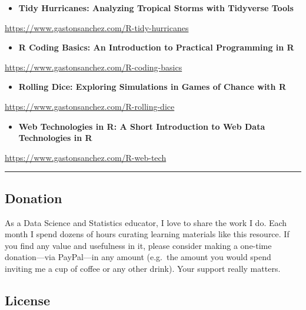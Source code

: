 \documentclass[
]{book}
\providecommand{\tightlist}{%
  \setlength{\itemsep}{0pt}\setlength{\parskip}{0pt}}
\begin{document}
\begin{itemize}
\tightlist
\item
  \textbf{Tidy Hurricanes: Analyzing Tropical Storms with Tidyverse Tools}
\end{itemize}

\url{https://www.gastonsanchez.com/R-tidy-hurricanes}

\begin{itemize}
\tightlist
\item
  \textbf{R Coding Basics: An Introduction to Practical Programming in R}
\end{itemize}

\url{https://www.gastonsanchez.com/R-coding-basics}

\begin{itemize}
\tightlist
\item
  \textbf{Rolling Dice: Exploring Simulations in Games of Chance with R}
\end{itemize}

\url{https://www.gastonsanchez.com/R-rolling-dice}

\begin{itemize}
\tightlist
\item
  \textbf{Web Technologies in R: A Short Introduction to Web Data Technologies in R}
\end{itemize}

\url{https://www.gastonsanchez.com/R-web-tech}

\begin{center}\rule{0.5\linewidth}{0.5pt}\end{center}

\hypertarget{donation}{%
\subsection*{Donation}\label{donation}}

As a Data Science and Statistics educator, I love to share the work I do. Each month I spend dozens of hours curating learning materials like this resource. If you find any value and usefulness in it, please consider making a one-time donation---via PayPal---in any amount (e.g.~the amount you would spend inviting me a cup of coffee or any other drink). Your support really matters.

\hypertarget{license}{%
\subsection*{License}\label{license}}
\end{document}
